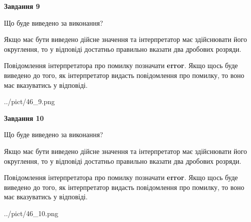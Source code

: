 \documentclass[12pt, ukrainian]{article}
\begin{document}
{\begin {Large}
{\begin {center}\textbf{Завдання 9}\end {center}}\par
Що буде виведено за виконання? \par

Якщо має бути виведено дійсне значення та інтерпретатор має здійснювати його округлення, 
то у відповіді достатньо правильно вказати два дробових розряди.

Повідомлення інтерпретатора про помилку позначати \textbf{error}.
Якщо щось буде виведено до того, як інтерпретатор видасть повідомлення про помилку, 
то воно має вказуватись у відповіді. \par

\begin{center}
	{../pict/46_9.png}
\end{center}
\newpage

{\begin {center}\textbf{Завдання 10}\end {center}}\par
Що буде виведено за виконання? \par

Якщо має бути виведено дійсне значення та інтерпретатор має здійснювати його округлення, 
то у відповіді достатньо правильно вказати два дробових розряди.

Повідомлення інтерпретатора про помилку позначати \textbf{error}.
Якщо щось буде виведено до того, як інтерпретатор видасть повідомлення про помилку, 
то воно має вказуватись у відповіді. \par

\begin{center}
	{../pict/46_10.png}
\end{center}
\newpage

\end {Large}}
\end{document}
